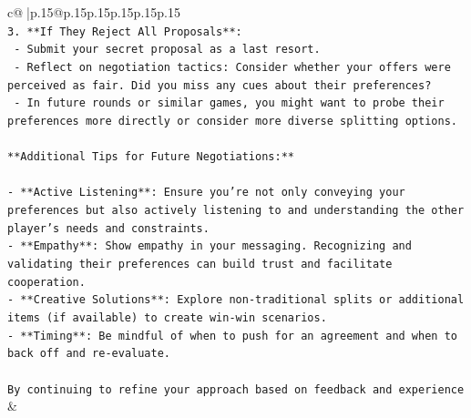 \documentclass{article}
\begin{document}
{\begin{supertabular}{c@{$\;$}|p{.15\linewidth}@{}p{.15\linewidth}p{.15\linewidth}p{.15\linewidth}p{.15\linewidth}p{.15\linewidth}}
{{{\\ 
\texttt{3. **If They Reject All Proposals**:} \\
\texttt{   {-} Submit your secret proposal as a last resort.} \\
\texttt{   {-} Reflect on negotiation tactics: Consider whether your offers were perceived as fair. Did you miss any cues about their preferences?} \\
\texttt{   {-} In future rounds or similar games, you might want to probe their preferences more directly or consider more diverse splitting options.} \\
\\ 
\texttt{**Additional Tips for Future Negotiations:**} \\
\\ 
\texttt{{-} **Active Listening**: Ensure you're not only conveying your preferences but also actively listening to and understanding the other player's needs and constraints.} \\
\texttt{{-} **Empathy**: Show empathy in your messaging. Recognizing and validating their preferences can build trust and facilitate cooperation.} \\
\texttt{{-} **Creative Solutions**: Explore non{-}traditional splits or additional items (if available) to create win{-}win scenarios.} \\
\texttt{{-} **Timing**: Be mindful of when to push for an agreement and when to back off and re{-}evaluate.} \\
\\ 
\texttt{By continuing to refine your approach based on feedback and experience} \\
            }
        }
    }
    & \\ \\


\end{supertabular}}
\end{document}
